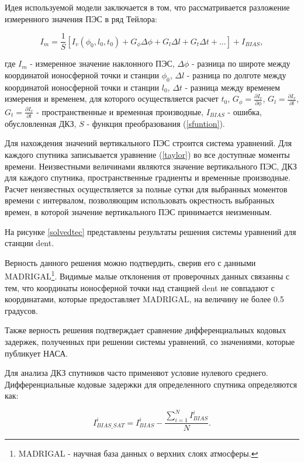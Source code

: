 \documentclass[a4paper]{article}
\begin{document}
Идея используемой модели заключается в том, что рассматривается разложение измеренного значения ПЭС в ряд Тейлора:

\begin{equation}
I_m = \frac{1}{S} \left[ I_v(\phi_0, l_0, t_0) + G_{\phi} \Delta\phi + G_l \Delta l + G_t \Delta t + ... \right] + I_{BIAS},
\label{taylor}
\end{equation}

где $I_m$ - измеренное значение наклонного ПЭС, $\Delta\phi$ - разница по широте между координатой ионосферной точки и станции $\phi_0$, $\Delta l$ - разница по долготе между координатой ионосферной точки и станции $l_0$, $\Delta t$ - разница между временем измерения и временем, для которого осуществляется расчет $t_0$, $G_{\phi} = \frac{\partial I_v}{\partial \phi}$, $G_l = \frac{\partial I_v}{\partial l}$, $G_t = \frac{\partial I_v}{\partial t}$ - пространственные и временная производные, $I_{BIAS}$ - ошибка, обусловленная ДКЗ, $S$ - функция преобразования (\ref{sfuntion}).

Для нахождения значений вертикального ПЭС строится система уравнений. Для каждого спутника записывается уравнение (\ref{taylor}) во все доступные моменты времени. Неизвестными величинами являются значение вертикального ПЭС, ДКЗ для каждого спутника, пространственные градиенты и временные производные. Расчет неизвестных осуществляется за полные сутки для выбранных моментов времени с интервалом, позволяющим использовать окрестность выбранных времен, в которой значение вертикального ПЭС принимается неизменным.

На рисунке \ref{solvedtec} представлены результаты решения системы уравнений для станции dent.

Верность данного решения можно подтвердить, сверив его с данными MADRIGAL\footnote{MADRIGAL - научная база данных о верхних слоях атмосферы.}. Видимые малые отклонения от проверочных данных связанны с тем, что координаты ионосферной точки над станцией dent не совпадают с координатами, которые предоставляет MADRIGAL, на величину не более 0.5 градусов.   

Также верность решения подтверждает сравнение дифференциальных кодовых задержек, полученных при решении системы уравнений, со значениями, которые публикует НАСА.

Для анализа ДКЗ спутников часто применяют условие нулевого среднего. Дифференциальные кодовые задержки для определенного спутника определяются как:

\begin{equation}
I_{BIAS\_SAT}^i = I_{BIAS}^i - \frac{\sum_{i=1}^{N}I_{BIAS}^i}{N}.
\end{equation}
\end{document}
